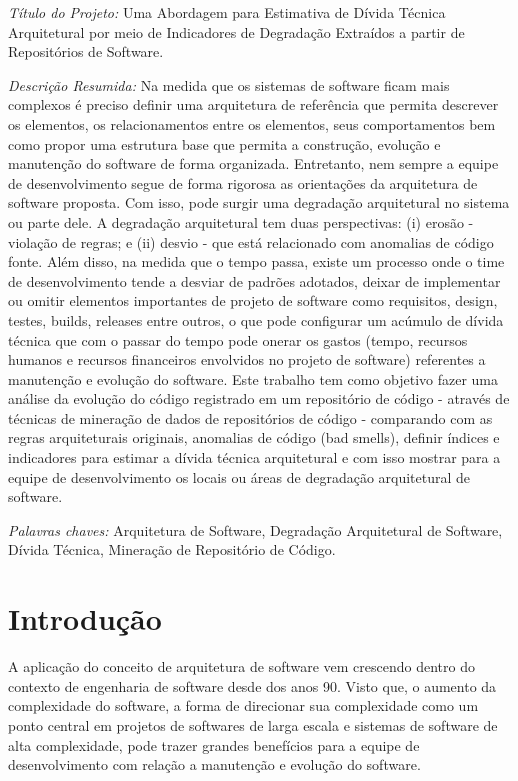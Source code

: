 \documentclass[
	12pt,				%
	openright,			%
	twoside,			%
	a4paper,			%
	english,			%
	french,				%
	spanish,			%
	brazil,				%
	]{abntex2}
\begin{document}
\emph{Título do Projeto:} Uma Abordagem para Estimativa de Dívida
Técnica Arquitetural por meio de Indicadores de Degradação Extraídos
a partir de Repositórios de Software. 

\emph{Descrição Resumida:} Na medida que os sistemas de software ficam
mais complexos é preciso definir uma arquitetura de referência que
permita descrever os elementos, os relacionamentos entre os elementos,
seus comportamentos bem como propor uma estrutura base que permita
a construção, evolução e manutenção do software de forma organizada.
Entretanto, nem sempre a equipe de desenvolvimento segue de forma
rigorosa as orientações da arquitetura de software proposta. Com isso,
pode surgir uma degradação arquitetural no sistema ou parte dele.
A degradação arquitetural tem duas perspectivas: (i) erosão - violação
de regras; e (ii) desvio - que está relacionado com anomalias de código
fonte. Além disso, na medida que o tempo passa, existe um processo
onde o time de desenvolvimento tende a desviar de padrões adotados,
deixar de implementar ou omitir elementos importantes de projeto de
software como requisitos, design, testes, builds, releases entre outros,
o que pode configurar um acúmulo de dívida técnica que com o passar
do tempo pode onerar os gastos (tempo, recursos humanos e recursos
financeiros envolvidos no projeto de software) referentes a manutenção
e evolução do software. Este trabalho tem como objetivo fazer uma
análise da evolução do código registrado em um repositório de código
- através de técnicas de mineração de dados de repositórios de código
- comparando com as regras arquiteturais originais, anomalias de código
(bad smells), definir índices e indicadores para estimar a dívida
técnica arquitetural e com isso mostrar para a equipe de desenvolvimento
os locais ou áreas de degradação arquitetural de software. 

\emph{Palavras chaves:} Arquitetura de Software, Degradação Arquitetural
de Software, Dívida Técnica, Mineração de Repositório de Código.

\chapter{Introdução}

A aplicação do conceito de arquitetura de software vem crescendo dentro
do contexto de engenharia de software desde dos anos 90. Visto que,
o aumento da complexidade do software, a forma de direcionar sua complexidade
como um ponto central em projetos de softwares de larga escala e sistemas
de software de alta complexidade, pode trazer grandes benefícios para
a equipe de desenvolvimento com relação a manutenção e evolução do
software. 
\end{document}
